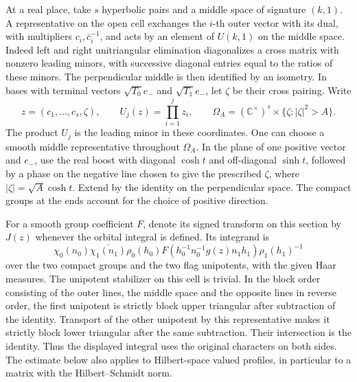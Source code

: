 \documentclass[a4paper,11pt]{article}
\theoremstyle{definition}
\theoremstyle{remark}
\numberwithin{equation}{section}
\begin{document}
At a real place, take \(s\) hyperbolic pairs and a middle space of
signature \((k,1)\). A representative on the open cell exchanges
the \(i\)-th outer vector with its dual, with multipliers
\(c_i,\bar c_i^{-1}\), and acts by an element of \(U(k,1)\) on
the middle space. Indeed left and right unitriangular elimination
diagonalizes a cross matrix with nonzero leading minors, with
successive diagonal entries equal to the ratios of these minors.
The perpendicular middle is then identified by an isometry.
In bases with terminal vectors \(\sqrt{T_0}e_-\) and
\(\sqrt{T_1}e_-\), let \(\zeta\) be their cross pairing. Write
\[
 z=(c_1,\ldots,c_s,\zeta),\qquad
 U_j(z)=\prod_{i=1}^j z_i,\qquad
 \Omega_A=(\mathbb C^\times)^s\times
                       \{\zeta:|\zeta|^2>A\}.
\]
The product \(U_j\) is the leading minor in these coordinates.
One can choose a smooth middle representative throughout
\(\Omega_A\). In the plane of one positive vector and \(e_-\),
use the real boost with diagonal \(\cosh t\) and off-diagonal
\(\sinh t\), followed by a phase on the negative line chosen
to give the prescribed \(\zeta\), where
\(|\zeta|=\sqrt A\cosh t\). Extend by the identity on the
perpendicular space. The compact groups at the ends account for
the choice of positive direction.

For a smooth group coefficient \(F\), denote its signed transform
on this section by \(J(z)\) whenever the orbital integral is
defined. Its integrand is
\[
 \chi_0(n_0)\overline{\chi_1(n_1)}
  \rho_0(h_0)F(h_0^{-1}n_0^{-1}g(z)n_1h_1)\rho_1(h_1)^{-1}
\]
over the two compact groups and the two flag unipotents, with
the given Haar measures. The unipotent stabilizer on this cell
is trivial. In the block order consisting of the outer lines,
the middle space and the opposite lines in reverse order, the
first unipotent is strictly block upper triangular after
subtraction of the identity. Transport of the other unipotent
by this representative makes it strictly block lower triangular
after the same subtraction. Their intersection is the identity.
Thus the displayed integral uses the original characters on
both sides. The estimate below also applies to Hilbert-space
valued profiles, in particular to a matrix with the
Hilbert--Schmidt norm.
\end{document}
